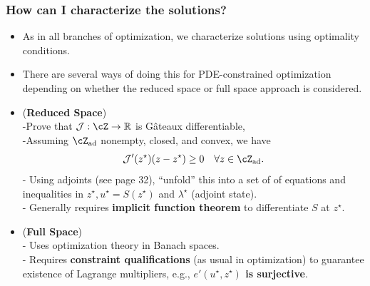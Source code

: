 \documentclass[aspectratio=169,xcolor=dvipsnames,10pt]{beamer}
\newcommand{\cJ}{\mathcal{J}}
\newcommand{\risk}{\mathcal{R}}
\begin{document}
\begin{frame}\frametitle{How can I characterize the solutions? }
\begin{block}{}
\begin{itemize}
\item As in all branches of optimization, we characterize solutions using optimality conditions.
\item There are several ways of doing this for PDE-constrained optimization depending on whether the reduced space or full space approach is considered.\pause
\item (\textbf{Reduced Space})\\ 
-Prove that $\cJ : \cZ \to \mathbb R$ is G\^{a}teaux differentiable,\\
-Assuming $\cZ_{\rm ad}$ nonempty, closed, and convex, we have
\[
\cJ'(z^{\star})(z - z^{\star}) \ge 0\quad \forall z \in \cZ_{\rm ad}.
\]
- Using adjoints (see page 32), ``unfold'' this into a set of of equations and inequalities in $z^{\star}, u^{\star} = S(z^{\star})$ and $\lambda^{\star}$ (adjoint state).\\
- Generally requires \textbf{implicit function theorem} to differentiate $S$ at $z^{\star}$.
\pause
\item (\textbf{Full Space})\\
- Uses optimization theory in Banach spaces. \\
- Requires \textbf{constraint qualifications} (as usual in optimization) to guarantee existence of Lagrange multipliers, e.g., \textbf{$e'(u^{\star},z^{\star})$ is surjective}.
\end{itemize}
\end{block}
\end{frame}

\end{document}
